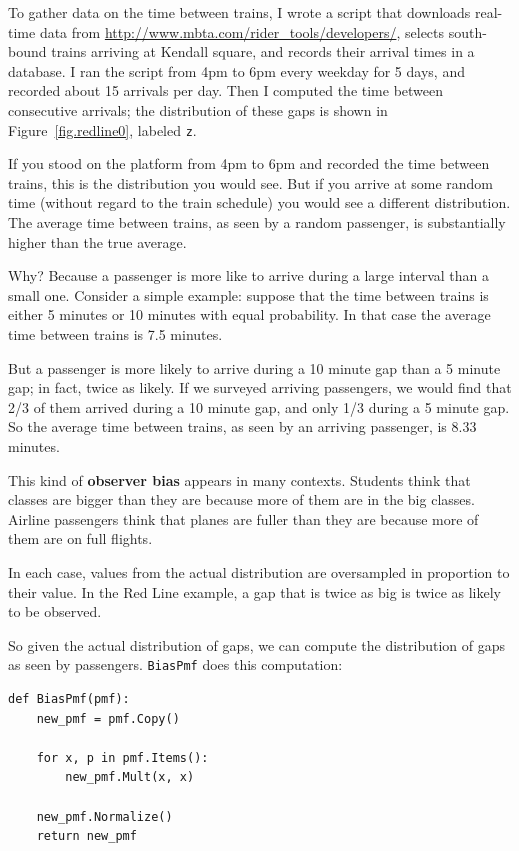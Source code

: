 \documentclass[12pt]{book}
\begin{document}
To gather data on the time between trains, I wrote a script that
downloads real-time data from
\url{http://www.mbta.com/rider_tools/developers/}, selects south-bound
trains arriving at Kendall square, and records their arrival times
in a database.  I ran the script from 4pm to 6pm every weekday
for 5 days, and recorded about 15 arrivals per day.  Then
I computed the time between consecutive arrivals; the distribution
of these gaps is shown in Figure~\ref{fig.redline0}, labeled {\tt z}.

If you stood on the platform from 4pm to 6pm and recorded the time
between trains, this is the distribution you would see.  But if you
arrive at some random time (without regard to the train schedule) you
would see a different distribution.  The average time
between trains, as seen by a random passenger, is substantially
higher than the true average.

Why?  Because a passenger is more like to arrive during a
large interval than a small one.  Consider a simple example:
suppose that the time between trains is either 5 minutes
or 10 minutes with equal probability.  In that case
the average time between
trains is 7.5 minutes.

But a passenger is more likely to arrive during a 10 minute gap 
than a 5 minute gap; in fact, twice as likely.  If we surveyed
arriving passengers, we would find that 2/3 of them arrived during
a 10 minute gap, and only 1/3 during a 5 minute gap.  So the
average time between trains, as seen by an arriving passenger,
is 8.33 minutes.

This kind of {\bf observer bias} appears in many contexts.  Students
think that classes are bigger than they are because more of them are
in the big classes.  Airline passengers think that planes are fuller
than they are because more of them are on full flights.

In each case, values from the actual distribution are
oversampled in proportion to their value.  In the Red Line example,
a gap that is twice as big is twice as likely to be observed.

So given the actual distribution of gaps, we can compute the
distribution of gaps as seen by passengers.  {\tt BiasPmf}
does this computation:

\begin{verbatim}
def BiasPmf(pmf):
    new_pmf = pmf.Copy()

    for x, p in pmf.Items():
        new_pmf.Mult(x, x)
        
    new_pmf.Normalize()
    return new_pmf
\end{verbatim}
\end{document}
